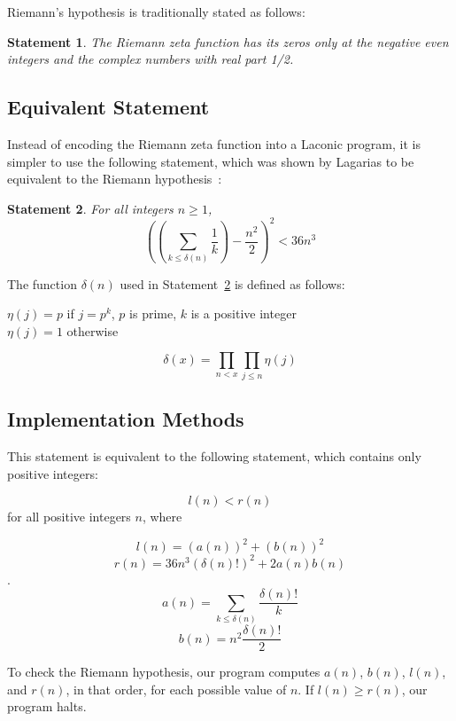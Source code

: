 \documentclass[11pt]{article}
\newtheorem{statement}{Statement}
\newenvironment{nscenter}
 {\parskip=0pt\par\nopagebreak\centering}
 {\par\noindent\ignorespacesafterend}
\begin{document}
Riemann's hypothesis is traditionally stated as follows:

\begin{statement}
\emph{The Riemann zeta function has its zeros only at the negative even integers and the complex numbers with real part 1/2.}
\label{goldbachstatement}
\end{statement}

\subsection{Equivalent Statement}

Instead of encoding the Riemann zeta function into a Laconic program, it is simpler to use the following statement, which was shown by Lagarias to be equivalent to the Riemann hypothesis~\cite{riemann}:

\begin{statement} \label{eq:riemann}
For all integers $n \ge 1$, 
$$\left(\left(\sum_{k \le \delta(n)} \frac{1}{k}\right) - \frac{n^2}{2}\right)^2 < 36n^3$$
\end{statement}

The function $\delta(n)$ used in Statement~\ref{eq:riemann} is defined as follows: 

\begin{nscenter}
$\eta(j) = p$ if $j = p^k$, $p$ is prime, $k$ is a positive integer \\
$\eta(j) = 1$ otherwise
\end{nscenter}
$$\delta(x) = \prod_{n<x}\prod_{j \le n} \eta(j)$$

\subsection{Implementation Methods}

This statement is equivalent to the following statement, which contains only positive integers\footnotemark:

$$l(n) < r(n)$$ for all positive integers $n$, where

$$l(n) = (a(n))^2 + (b(n))^2$$
$$r(n) = 36n^3(\delta(n)!)^2 + 2a(n)b(n)$$.
$$a(n) = \sum_{k \le \delta(n)} \frac{\delta(n)!}{k}$$
$$b(n) = n^2\frac{\delta(n)!}{2}$$

To check the Riemann hypothesis, our program computes $a(n)$, $b(n)$, $l(n)$, and $r(n)$, in that order, for each possible value of $n$. If $l(n) \ge r(n)$, our program halts.
\end{document}
